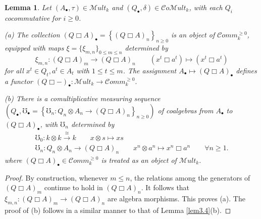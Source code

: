 \documentclass[10pt, colorlinks]{article}
\numberwithin{equation}{section} \DeclareMathSizes{2}{10}{12}{13}
\newtheorem{lem}[thm]{Lemma}
\begin{document}
    
     \begin{lem}\label{lem6.6}
        Let $(A_\bullet,\tau)\in \mathscr Mult_k$ and $(Q_\bullet,\delta)\in \mathcal Co\mathscr Mult_k $, with each $Q_i$ cocommutative for $i\geq 0$.

        
        \medskip 
        \noindent
        (a) The collection $(Q\Box A)_\bullet=\left\{(Q\Box A)_n\right\}_{n\geq 0}$ is an object of $\mathcal Comm^{\geq 0}_k$, equipped with maps $\xi=\{\xi_{m,n}\}_{0\leq m\leq n}$  determined by
            \begin{equation}\label{eq6.13t}
                \xi_{m,n}:(Q\Box A)_m\longrightarrow (Q\Box A)_n\qquad (x^t\Box a^t)\longmapsto (x^t\Box a^t)
            \end{equation}
             for all $x^t\in Q_t, a^t\in A_t $ with $1\leq t\leq m$. The assignment $A_\bullet\mapsto (Q\Box A)_\bullet$ defines a functor $(Q\Box-)_\bullet:\mathscr Mult_k\longrightarrow \mathcal Comm_k^{\geq 0}.$


             \medskip
             \noindent


             (b) There is a comultiplicative measuring sequence $(Q_\bullet,\mho_\bullet=\left\{\mho_n:Q_n\otimes A_n\longrightarrow (Q\Box A)_n\right\}_{n\geq 0})$ of coalgebras from $A_\bullet$ to $(Q\Box A)_\bullet$, with $\mho_n$ determined  by
        \begin{equation*}
        \begin{array}{c}
              \mho_0:k\otimes k\overset{\cong}{\longrightarrow} k \qquad x\otimes s\longmapsto xs \\
               \mho_n: Q_n\otimes A_n\longrightarrow (Q\Box A)_n\qquad x^n\otimes a^n\mapsto x^n\Box a^n\qquad \forall n\geq 1.
        \end{array}
        \end{equation*} where $(Q\Box A)_\bullet\in \mathcal Comm_k^{\geq 0}$ is treated as an object of $\mathscr Mult_k$.
        \end{lem}


        
        \begin{proof}
          By construction, whenever $m\leq n$, the relations among the generators of $(Q\Box A)_m$ continue to hold in $(Q\Box A)_n$. It follows that  $\xi_{m,n}:(Q\Box A)_m\longrightarrow (Q\Box A)_n$  are algebra morphisms. This proves (a). The proof of (b) follows in a similar manner to that of Lemma \ref{lem3.4}(b). 
        \end{proof}
\end{document}

